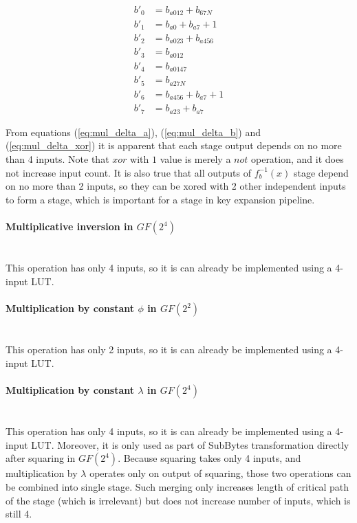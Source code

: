 \begin{equation}
\label{eq:mul_delta_inf_b}
\begin{aligned}
b'_0 &= b_{a012} + b_{67N}           \\
b'_1 &= b_{a0} + b_{a7} + 1          \\
b'_2 &= b_{a023} + b_{a456}          \\
b'_3 &= b_{a012}                     \\
b'_4 &= b_{a0147}                    \\
b'_5 &= b_{a27N}                     \\
b'_6 &= b_{a456} + b_{a7} + 1        \\
b'_7 &= b_{a23} + b_{a7}                    
\end{aligned}
\end{equation}

From equations (\ref{eq:mul_delta_a}), (\ref{eq:mul_delta_b}) and (\ref{eq:mul_delta_xor}) it is apparent that each stage output depends on no more than 4 inputs. Note that $xor$ with $1$ value is merely a $not$ operation, and it does not increase input count. It is also true that all outputs of $f_b^{-1}(x)$ stage depend on no more than 2 inputs, so they can be xored with 2 other independent inputs to form a stage, which is important for a stage in key expansion pipeline.



\paragraph{Multiplicative inversion in $GF(2^4)$}\mbox{}\\
This operation has only 4 inputs, so it is can already be implemented using a 4-input LUT.

\paragraph{Multiplication by constant $\phi$ in $GF(2^2)$}\mbox{}\\
This operation has only 2 inputs, so it is can already be implemented using a 4-input LUT. 

\paragraph{Multiplication by constant $\lambda$ in $GF(2^4)$}\mbox{}\\
This operation has only 4 inputs, so it is can already be implemented using a 4-input LUT. Moreover, it is only used as part of SubBytes transformation directly after squaring in $GF(2^4)$. Because squaring takes only 4 inputs, and multiplication by $\lambda$ operates only on output of squaring, those two operations can be combined into single stage. Such merging only increases length of critical path of the stage (which is irrelevant) but does not increase number of inputs, which is still 4.


